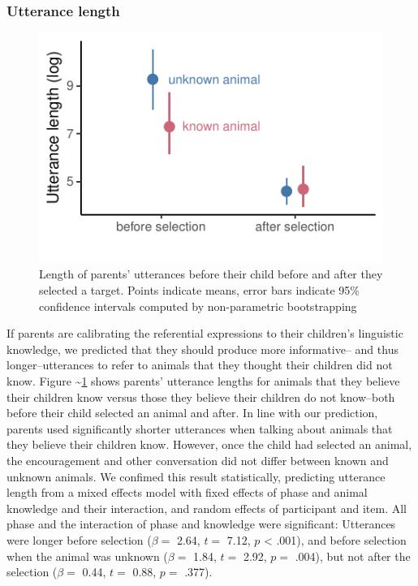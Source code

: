 \documentclass[10pt, letterpaper]{article}
\newenvironment{CodeChunk}{}{}
\begin{document}
\subsubsection{Utterance length}\label{utterance-length}

\begin{CodeChunk}
\begin{figure}[tb]
\includegraphics{figs/known_plot-1} \caption[Length of parents' utterances before their child before and after they selected a target]{Length of parents' utterances before their child before and after they selected a target. Points indicate means, error bars indicate 95\% confidence intervals computed by non-parametric bootstrapping}\label{fig:known_plot}
\end{figure}
\end{CodeChunk}

If parents are calibrating the referential expressions to their
children's linguistic knowledge, we predicted that they should produce
more informative-- and thus longer--utterances to refer to animals that
they thought their children did not know. Figure
\textasciitilde{}\ref{fig:known_plot} shows parents' utterance lengths
for animals that they believe their children know versus those they
believe their children do not know--both before their child selected an
animal and after. In line with our prediction, parents used
significantly shorter utterances when talking about animals that they
believe their children know. However, once the child had selected an
animal, the encouragement and other conversation did not differ between
known and unknown animals. We confimed this result statistically,
predicting utterance length from a mixed effects model with fixed
effects of phase and animal knowledge and their interaction, and random
effects of participant and item. All phase and the interaction of phase
and knowledge were significant: Utterances were longer before selection
(\(\beta =\) 2.64, \(t =\) 7.12, \(p\) \textless{} .001), and before
selection when the animal was unknown (\(\beta =\) 1.84, \(t =\) 2.92,
\(p =\) .004), but not after the selection (\(\beta =\) 0.44, \(t =\)
0.88, \(p =\) .377).
\end{document}
